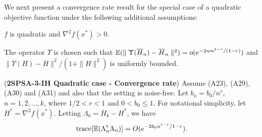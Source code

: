 We next present a convergence rate result for the special case of a quadratic objective function under the following additional assumptions:
\begin{pvn}
\item  $f$ is quadratic and $\nabla^2 f(x^*) > 0$. 
\item The operator $\Upsilon$ is chosen such that $\mathbb{E}(\parallel \Upsilon(\overline H_n) - \overline H_n\parallel^2) = o(e^{-2wn^{1-r}/(1-r)})$ and \\$\parallel \Upsilon(H) - H \parallel^2 / (1+\parallel H \parallel^2)$ is uniformly bounded.
\end{pvn}
\begin{theorem}(\textbf{2SPSA-3-IH Quadratic case - Convergence rate})
\label{thm:spsaquad-bound}
Assume (A23), (A29), (A30) and (A31) and also that the setting is noise-free. 
Let $b_n = b_0/n^r$, $n=1,2,\ldots,k$, where $1/2 < r < 1$ and $0 < b_0 \leq 1$. For notational simplicity, let $H^*=\nabla^2 f(x^*)$. Letting $\Lambda_k = \overline H_k - H^*$, we have 
\begin{align}
\text{trace}[\mathbb{E} (\Lambda_n ^\mathsf{\scriptscriptstyle T} \Lambda_n)] = O(e^{-2b_0n^{1-r} / {1-r}}).
\label{eq:spsaquad-bigo}
\end{align}
\end{theorem}
